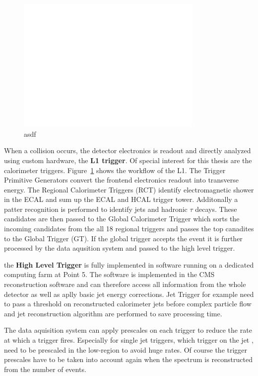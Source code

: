 \begin{figure}[htp]
    \centering
    \includegraphics[width=0.8\textwidth]{figures/cms_detector/cms_l1_trigger.pdf}\hfill
    \caption[The L1 Trigger of CMS]{asdf}
    \label{fig:cms:l1_trigger}
\end{figure}

When a collision occurs, the detector electronics is readout and directly
analyzed using custom hardware, the \textbf{L1 trigger}. Of special interest for
this thesis are the calorimeter triggers. Figure~\ref{fig:cms:l1_trigger} shows
the workflow of the L1. The Trigger Primitive Generators convert the frontend
electronics readout into transverse energy. The Regional Calorimeter Triggers
(RCT) identify electromagnetic shower in the ECAL and sum up the ECAL and HCAL
trigger tower. Additonally a patter recognition is performed to identify jets
and hadronic $\tau$ decays. These candidates are then passed to the Global
Calorimeter Trigger which sorts the incoming candidates from the all 18 regional
triggers and passes the top canadites to the Global Trigger (GT). If the global
trigger accepts the event it is further processed by the data aqusition system
and passed to the high level trigger.

the \textbf{High Level Trigger} is fully implemented in software running on a
dedicated computing farm at Point 5. The software is implemented in the CMS
reconstruction software and can therefore access all information from the whole
detector as well as aplly basic jet energy corrections. Jet Trigger for example
need to pass a \pt threshold on reconstructed calorimeter jets before complex
particle flow and jet reconstruction algorithm are performed to save processing
time.

The data aquisition system can apply prescales on each trigger to reduce the
rate at which a trigger fires. Especially for single jet triggers, which
trigger on the jet \pt, need to be prescaled in the low-\pt region to avoid huge
rates. Of course the trigger prescales have to be taken into account again when
the spectrum is reconstructed from the number of events.

